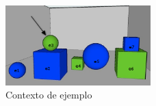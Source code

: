 


\begin{figure}[ht]
\begin{center}
\includegraphics[width=0.5\textwidth]{images/3b.png}
\caption{Contexto de ejemplo}\label{GRE3D7-stimulus-cap2}
\end{center}
\end{figure}

